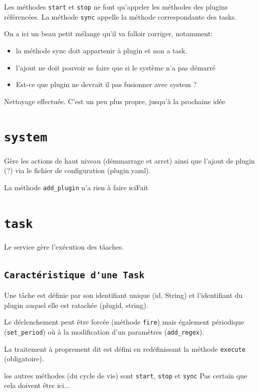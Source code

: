 Les méthodes \lstinline|start| et \lstinline|stop| ne font qu'appeler les méthodes des plugins référencées. La méthode \lstinline|sync| appelle la méthode correspondante des tasks.

{\color{red}On a ici un beau petit mélange qu'il va falloir corriger, notamment:
	\begin{itemize}
		\item la méthode sync doit appartenir à plugin et non a task.
		\item l'ajout ne doit pouvoir se faire que si le système n'a pas démarré
		\item Est-ce que plugin ne devrait il pas fusionner avec system ?
	\end{itemize}
}
{\color{green}Nettoyage effectuée. C'est un peu plus propre, jusqu'à la prochaine idée}


\section{\lstinline|system|}

Gère les actions de haut niveau (démmarrage et arret) ainsi que l'ajout de plugin (?) via le fichier de configuration (plugin.yaml).

{\color{red}La méthode \lstinline|add_plugin| n'a rien à faire ici}{\color{green}Fait}

\section{\lstinline|task|}

Le service gère l'exécution des tâaches.

\subsection{\lstinline|Caractéristique d'une Task|}

Une tâche est définie par son identifiant unique (id, String) et l'identifiant du plugin auquel elle est ratachée (plugid, string).

Le déclenchement peut être forcée (méthode \lstinline|fire|) mais également périodique (\lstinline|set_period|) où à la modification d'un paramètres (\lstinline|add_regex|).

La traitement à proprement dit est défini en redéfinissant la méthode \lstinline|execute| (obligatoire).

les autres méthodes (du cycle de vie) sont \lstinline|start|, \lstinline|stop| et \lstinline|sync| {\color{red}Pas certain que cela doivent être ici...}


